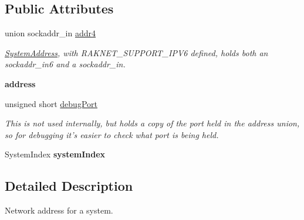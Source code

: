 \subsection*{Public Attributes}
\begin{DoxyCompactItemize}
\item 
\hypertarget{struct_rak_net_1_1_system_address_a5cad41cb8ffb9ca2c9e5ea01b0187f9c}{union sockaddr\-\_\-in \hyperlink{struct_rak_net_1_1_system_address_a5cad41cb8ffb9ca2c9e5ea01b0187f9c}{addr4}}\label{struct_rak_net_1_1_system_address_a5cad41cb8ffb9ca2c9e5ea01b0187f9c}

\begin{DoxyCompactList}\small\item\em \hyperlink{struct_rak_net_1_1_system_address}{System\-Address}, with R\-A\-K\-N\-E\-T\-\_\-\-S\-U\-P\-P\-O\-R\-T\-\_\-\-I\-P\-V6 defined, holds both an sockaddr\-\_\-in6 and a sockaddr\-\_\-in. \end{DoxyCompactList}\item 
\hypertarget{struct_rak_net_1_1_system_address_a8435e6ba7eb57df41625540449ec373e}{{\bfseries address}}\label{struct_rak_net_1_1_system_address_a8435e6ba7eb57df41625540449ec373e}

\item 
\hypertarget{struct_rak_net_1_1_system_address_ad5adf9db8364ea2730c1204cdaace09f}{unsigned short \hyperlink{struct_rak_net_1_1_system_address_ad5adf9db8364ea2730c1204cdaace09f}{debug\-Port}}\label{struct_rak_net_1_1_system_address_ad5adf9db8364ea2730c1204cdaace09f}

\begin{DoxyCompactList}\small\item\em This is not used internally, but holds a copy of the port held in the address union, so for debugging it's easier to check what port is being held. \end{DoxyCompactList}\item 
\hypertarget{struct_rak_net_1_1_system_address_aff557611cfdeb91952f5d4c622109522}{System\-Index {\bfseries system\-Index}}\label{struct_rak_net_1_1_system_address_aff557611cfdeb91952f5d4c622109522}

\end{DoxyCompactItemize}


\subsection{Detailed Description}
Network address for a system. 

